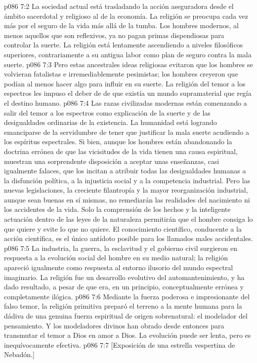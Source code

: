 \vs p086 7:2 La sociedad actual está trasladando la acción aseguradora desde el ámbito sacerdotal y religioso al de la economía. La religión se preocupa cada vez más por el seguro de la vida más allá de la tumba. Los hombres modernos, al menos aquellos que son reflexivos, ya no pagan primas dispendiosas para controlar la suerte. La religión está lentamente ascendiendo a niveles filosóficos superiores, contrariamente a su antigua labor como plan de seguro contra la mala suerte.
\vs p086 7:3 Pero estas ancestrales ideas religiosas evitaron que los hombres se volvieran fatalistas e irremediablemente pesimistas; los hombres creyeron que podían al menos hacer algo para influir en su suerte. La religión del temor a los espectros les impuso el deber de  de que existía un mundo supramaterial que regía el destino humano.
\vs p086 7:4 Las razas civilizadas modernas están comenzando a salir del temor a los espectros como explicación de la suerte y de las desigualdades ordinarias de la existencia. La humanidad está logrando emanciparse de la servidumbre de tener que justificar la mala suerte acudiendo a los espíritus espectrales. Si bien, aunque los hombres están abandonando la doctrina errónea de que las vicisitudes de la vida tienen una causa espiritual, muestran una sorprendente disposición a aceptar unas enseñanzas, casi igualmente falaces, que los incitan a atribuir todas las desigualdades humanas a la disfunción política, a la injusticia social y a la competencia industrial. Pero las nuevas legislaciones, la creciente filantropía y la mayor reorganización industrial, aunque sean buenas en sí mismas, no remediarán las realidades del nacimiento ni los accidentes de la vida. Solo la comprensión de los hechos y la inteligente actuación dentro de las leyes de la naturaleza permitirán que el hombre consiga lo que quiere y evite lo que no quiere. El conocimiento científico, conducente a la acción científica, es el único antídoto posible para los llamados males accidentales.
\vs p086 7:5 \pc La industria, la guerra, la esclavitud y el gobierno civil surgieron en respuesta a la evolución social del hombre en su medio natural; la religión apareció igualmente como respuesta al entorno ilusorio del mundo espectral imaginario. La religión fue un desarrollo evolutivo del automantenimiento, y ha dado resultado, a pesar de que era, en un principio, conceptualmente errónea y completamente ilógica.
\vs p086 7:6 Mediante la fuerza poderosa e impresionante del falso temor, la religión primitiva preparó el terreno a la mente humana para la dádiva de una genuina fuerza espiritual de origen sobrenatural: el modelador del pensamiento. Y los modeladores divinos han obrado desde entonces para transmutar el temor a Dios en amor a Dios. La evolución puede ser lenta, pero es inequívocamente efectiva.
\vsetoff
\vs p086 7:7 [Exposición de una estrella vespertina de Nebadón.]
